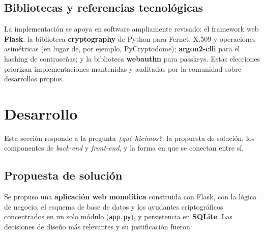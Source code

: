 \documentclass[10pt,letterpaper]{report}
\renewcommand{\_}{\textunderscore\allowbreak}
\begin{document}
\section{Bibliotecas y referencias tecnol\'ogicas}
La implementaci\'on se apoya en software ampliamente revisado: el framework
web \textbf{Flask}; la biblioteca \textbf{cryptography} de Python para Fernet,
X.509 y operaciones asim\'etricas (en lugar de, por ejemplo, PyCryptodome);
\textbf{argon2-cffi} para el hashing de contrase\~nas; y la biblioteca
\textbf{webauthn} para passkeys. Estas elecciones priorizan implementaciones
mantenidas y auditadas por la comunidad sobre desarrollos propios.

\chapter{Desarrollo}

Esta secci\'on responde a la pregunta \textit{¿qu\'e hicimos?}: la propuesta de
soluci\'on, los componentes de \textit{back-end} y \textit{front-end}, y la forma
en que se conectan entre s\'i.

\section{Propuesta de soluci\'on}
Se propuso una \textbf{aplicaci\'on web monol\'itica} construida con Flask, con la
l\'ogica de negocio, el esquema de base de datos y los ayudantes criptogr\'aficos
concentrados en un solo m\'odulo (\texttt{app.py}), y persistencia en
\textbf{SQLite}. Las decisiones de dise\~no m\'as relevantes y su justificaci\'on
fueron:
\end{document}
